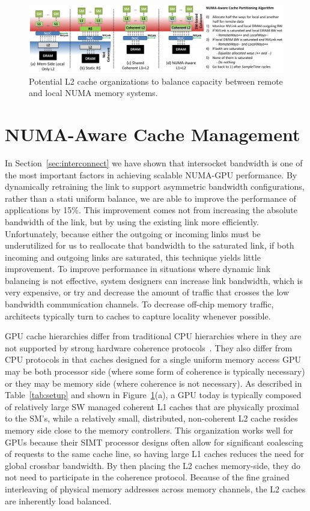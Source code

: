 \begin{figure}[t]
    \centering
    \includegraphics[width=1.0\textwidth]{figures/cache_configurations_static_dynamic.pdf}
    \caption{Potential L2 cache organizations to balance capacity between remote and
    local NUMA memory systems.}
    \label{fig:cacheorg}
\end{figure}

\section{NUMA-Aware Cache Management}
\label{caching}
In Section~\ref{sec:interconnect} we have shown that intersocket bandwidth is one
of the most important factors in achieving scalable NUMA-GPU performance. By
dynamically retraining the link to support asymmetric bandwidth configurations,
rather than a stati uniform balance, we are able to improve the performance
of applications by 15\%.  This improvement comes not from increasing the
absolute bandwidth of the link, but by using the existing link more efficiently.
Unfortunately, because either the outgoing or incoming links must be underutilized
for us to reallocate that bandwidth to the saturated link, if both incoming and
outgoing links are saturated, this technique yields little improvement.
To improve performance in situations where dynamic link balancing is not effective,
system designers can increase link bandwidth, which is very expensive,
or try and decrease the amount of traffic that crosses the low bandwidth
communication channels.  To decrease off-chip memory traffic, architects typically
turn to caches to capture locality whenever possible.

GPU cache hierarchies differ from traditional CPU hierarchies where in they are
not supported by strong hardware coherence protocols~\cite{XXX}.  They also differ
from CPU protocols in that caches designed for a single uniform memory access GPU
may be both processor side (where some form of coherence is typically necessary)
or they may be memory side (where coherence is not necessary).  As described in
Table~\ref{tab:setup} and shown in Figure~\ref{fig:cacheorg}(a), a GPU today is
typically composed of relatively large SW managed coherent L1 caches that are 
physically proximal to the SM's, while a relatively small, distributed, non-coherent 
L2 cache resides memory side close to the memory controllers.  This
organization works well for GPUs because their SIMT processor designs often allow
for significant coalescing of requests to the same cache line, so having large
L1 caches reduces the need for global crossbar bandwidth.  By then placing the L2
caches memory-side, they do not need to participate in the coherence protocol.  Because of the fine grained interleaving of physical memory addresses
across memory channels, the L2 caches are inherently load balanced.

